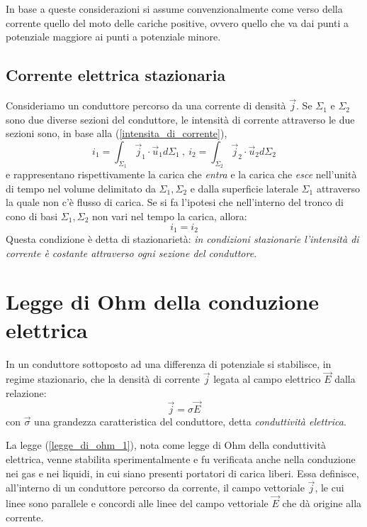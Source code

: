 \documentclass[class=book, crop=false, oneside, 12pt]{standalone}
\begin{document}
In base a queste considerazioni si assume convenzionalmente come verso della corrente quello del moto delle cariche positive, ovvero quello che va dai punti a potenziale maggiore ai punti a potenziale minore.

\subsection{Corrente elettrica stazionaria}
Consideriamo un conduttore percorso da una corrente di densità \(\overrightarrow{j}\). 
Se \(\Sigma_1\) e \(\Sigma_2\) sono due diverse sezioni del conduttore, le intensità di corrente attraverso le due sezioni sono, in base alla (\ref{intensita_di_corrente}),
\begin{equation*}
    i_1 = \int_{\Sigma_1} \overrightarrow{j}_1 \cdot \overrightarrow{u}_1 d \Sigma_1 \ , \ i_2 = \int_{\Sigma_2} \overrightarrow{j}_2 \cdot \overrightarrow{u}_2 d \Sigma_2
\end{equation*}
e rappresentano rispettivamente la carica che \emph{entra} e la carica che \emph{esce} nell'unità di tempo nel volume delimitato da \(\Sigma_1, \Sigma_2\) e dalla superficie laterale \(\Sigma_1\) attraverso la quale non c'è flusso di carica. 
Se si fa l'ipotesi che nell'interno del tronco di cono di basi \(\Sigma_1, \Sigma_2\) non vari nel tempo la carica, allora: 
\begin{equation}
    i_1 = i_2
\end{equation}
Questa condizione è detta di stazionarietà: \emph{in condizioni stazionarie l'intensità di corrente è costante attraverso ogni sezione del conduttore}. 

\section{Legge di Ohm della conduzione elettrica}

In un conduttore sottoposto ad una differenza di potenziale si stabilisce, in regime stazionario, che la densità di corrente \(\overrightarrow{j}\) legata al campo elettrico \(\overrightarrow{E}\) dalla relazione: 
\begin{equation} \label{legge_di_ohm_1}
    \overrightarrow{j} = \sigma \overrightarrow{E}
\end{equation}
con \(\overrightarrow{\sigma}\) una grandezza caratteristica del conduttore, detta \emph{conduttività elettrica}. 

La legge (\ref{legge_di_ohm_1}), nota come legge di Ohm della conduttività elettrica, venne stabilita sperimentalmente e fu verificata anche nella conduzione nei gas e nei liquidi, in cui siano presenti portatori di carica liberi. 
Essa definisce, all'interno di un conduttore percorso da corrente, il campo vettoriale \(\overrightarrow{j}\), le cui linee sono parallele e concordi alle linee del campo vettoriale \(\overrightarrow{E}\) che dà origine alla corrente. 
\end{document}

